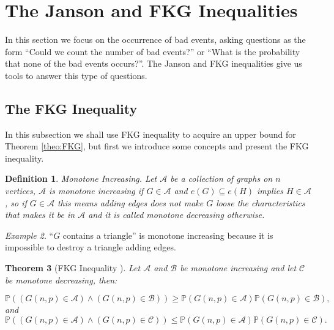 \documentclass[12pt,twoside,a4paper,bibliography=totocnumbered]{book}
\numberwithin{equation}{section}
\newtheorem{theorem}             {Theorem}[section]
\newtheorem{definition}	[theorem] {Definition}
\theoremstyle{remark}
\newtheorem{example}	[theorem] {Example}
\begin{document}
\section{The Janson and FKG Inequalities}

In this section we focus on the occurrence of  bad events, asking questions as the form ``Could we count the number of bad events?'' or ``What is the probability that none of the bad events occurs?''. The Janson and FKG inequalities give us tools to answer this type of questions.

\subsection{The FKG Inequality}
In this subsection we shall use FKG inequality to acquire an upper bound for Theorem \ref{theo:FKG}, but first we introduce some concepts and present the FKG inequality.

\begin{definition}
Monotone Increasing. Let $\mathcal{A}$ be a collection of graphs on $n$ vertices, $\mathcal{A}$ is monotone increasing if $G \in \mathcal{A}$ and $e(G) \subseteq e(H)$ implies $H \in \mathcal{A}$, so if $G \in \mathcal{A}$ this means adding edges does not make $G$ loose the characteristics that makes it be in $\mathcal{A}$ and it is called monotone decreasing otherwise.     
\end{definition}

\begin{example}
``$G$ contains a triangle'' is monotone increasing because it is impossible to destroy a triangle adding edges.
\end{example}

\begin{theorem} [{FKG Inequality \cite{FKG71}}]
 Let $\mathcal{A}$ and $\mathcal{B}$ be monotone increasing and let $\mathcal{C}$ be monotone decreasing, then:

$$ \mathbb{P}((G(n,p) \in \mathcal{A}) \wedge (G(n,p) \in \mathcal{B})) \geq \mathbb{P}(G(n,p) \in \mathcal{A})\mathbb{P}(G(n,p) \in \mathcal{B}),$$
and
$$ \mathbb{P}((G(n,p) \in \mathcal{A}) \wedge (G(n,p) \in \mathcal{C})) \leq \mathbb{P}(G(n,p) \in \mathcal{A})\mathbb{P}(G(n,p) \in \mathcal{C}).$$
\end{theorem}
\end{document}
